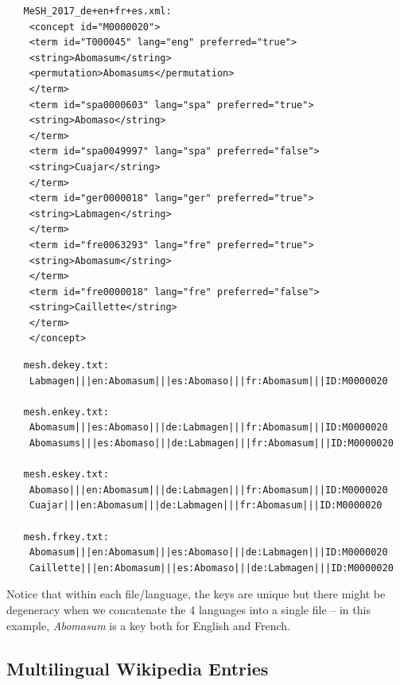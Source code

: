 \documentclass[a4paper,11pt]{article}
\begin{document}
	{\small 
	\lstset{language=XML}
	\begin{lstlisting} 
   MeSH_2017_de+en+fr+es.xml:
	<concept id="M0000020">
	<term id="T000045" lang="eng" preferred="true">
	<string>Abomasum</string>
	<permutation>Abomasums</permutation>
	</term>
	<term id="spa0000603" lang="spa" preferred="true">
	<string>Abomaso</string>	
	</term>
	<term id="spa0049997" lang="spa" preferred="false">
	<string>Cuajar</string>
	</term>
	<term id="ger0000018" lang="ger" preferred="true">
	<string>Labmagen</string>
	</term>
	<term id="fre0063293" lang="fre" preferred="true">
	<string>Abomasum</string>
	</term>
	<term id="fre0000018" lang="fre" preferred="false">
	<string>Caillette</string>
	</term>
	</concept>
	\end{lstlisting}
		
	\begin{lstlisting} 
   mesh.dekey.txt:
	Labmagen|||en:Abomasum|||es:Abomaso|||fr:Abomasum|||ID:M0000020
	
   mesh.enkey.txt:
	Abomasum|||es:Abomaso|||de:Labmagen|||fr:Abomasum|||ID:M0000020
	Abomasums|||es:Abomaso|||de:Labmagen|||fr:Abomasum|||ID:M0000020
		
   mesh.eskey.txt:       
	Abomaso|||en:Abomasum|||de:Labmagen|||fr:Abomasum|||ID:M0000020
	Cuajar|||en:Abomasum|||de:Labmagen|||fr:Abomasum|||ID:M0000020
		
   mesh.frkey.txt:  
	Abomasum|||en:Abomasum|||es:Abomaso|||de:Labmagen|||ID:M0000020
	Caillette|||en:Abomasum|||es:Abomaso|||de:Labmagen|||ID:M0000020
	\end{lstlisting}
	}
	
	
	Notice that within each file/language, the keys are unique but there might be degeneracy when we concatenate the 4 languages into a single file -- in this example, \emph{Abomasum} is a key both for English and French.
	
	\subsection{Multilingual Wikipedia Entries}
	\label{ss:wpLex}
	
\end{document}
